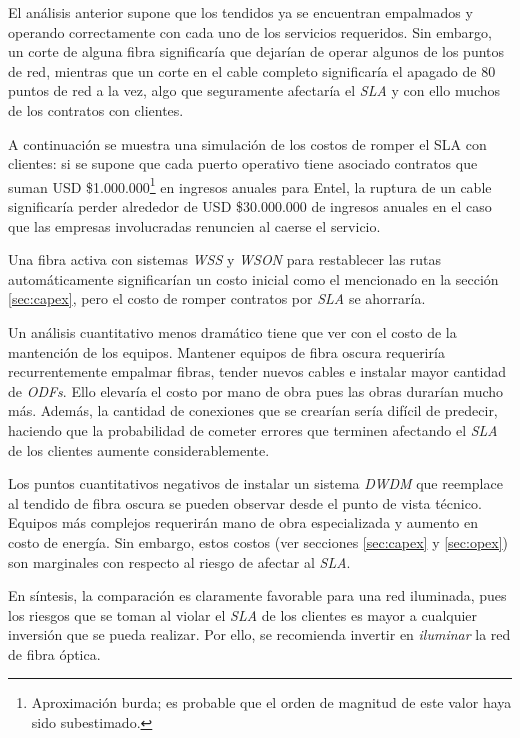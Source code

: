 El análisis anterior supone que los tendidos ya se encuentran
empalmados y operando correctamente con cada uno de los servicios
requeridos. Sin embargo, un corte de alguna fibra significaría que
dejarían de operar algunos de los puntos de red, mientras que un corte
en el cable completo significaría el apagado de 80 puntos de red a la
vez, algo que seguramente afectaría el \emph{SLA} y con ello muchos de
los contratos con clientes.

A continuación se muestra una simulación de los costos de romper el
\textsf{SLA} con clientes: si se supone que cada puerto operativo
tiene asociado contratos que suman USD
\$1.000.000\footnote{Aproximación burda; es probable que el orden de
  magnitud de este valor haya sido subestimado.} en ingresos anuales
para Entel, la ruptura de un cable significaría perder alrededor de 
USD \$30.000.000 de ingresos anuales en el caso que las empresas 
involucradas renuncien al caerse el servicio.

Una fibra activa con sistemas \emph{WSS} y \emph{WSON} para
restablecer las rutas automáticamente significarían un costo inicial 
como el mencionado en la sección \ref{sec:capex}, pero el
costo de romper contratos por \emph{SLA} se ahorraría.

Un análisis cuantitativo menos dramático tiene que ver con el costo de
la mantención de los equipos. Mantener equipos de fibra oscura
requeriría recurrentemente empalmar fibras, tender nuevos cables e
instalar mayor cantidad de \emph{ODFs}. Ello elevaría el costo por mano
de obra pues las obras durarían mucho más. Además, la cantidad de
conexiones que se crearían sería difícil de predecir, haciendo que la 
probabilidad de cometer errores que terminen afectando el \emph{SLA} 
de los clientes aumente considerablemente.

Los puntos cuantitativos negativos de instalar un sistema \emph{DWDM}
que reemplace al tendido de fibra oscura se pueden observar desde el
punto de vista técnico. Equipos más complejos requerirán mano de obra
especializada y aumento en costo de energía. Sin embargo, estos costos
(ver secciones \ref{sec:capex} y \ref{sec:opex}) son marginales con 
respecto al riesgo de afectar al \emph{SLA}.

En síntesis, la comparación es claramente favorable para una red 
iluminada, pues los riesgos que se toman al violar el \emph{SLA} de los
clientes es mayor a cualquier inversión que se pueda realizar. Por ello, 
se recomienda invertir en \emph{iluminar} la red de fibra óptica.

